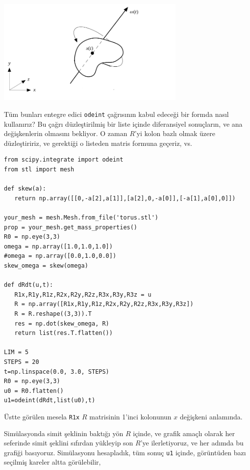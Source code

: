 \documentclass[12pt,fleqn]{article}\usepackage{../../common}
\begin{document}
\includegraphics[width=25em]{compscieng_bpp32sim_rigbod_01.png}

Tüm bunları entegre edici \verb!odeint! çağrısının kabul edeceği bir formda
nasıl kullanırız? Bu çağrı düzleştirilmiş bir liste içinde diferansiyel
sonuçların, ve ana değişkenlerin olmasını bekliyor. O zaman $R$'yi kolon bazlı
olmak üzere düzleştiririz, ve gerektiği o listeden matris formuna geçeriz, vs.

\begin{verbatim}
from scipy.integrate import odeint
from stl import mesh

def skew(a):
   return np.array([[0,-a[2],a[1]],[a[2],0,-a[0]],[-a[1],a[0],0]])

your_mesh = mesh.Mesh.from_file('torus.stl')
prop = your_mesh.get_mass_properties()
R0 = np.eye(3,3)
omega = np.array([1.0,1.0,1.0])
#omega = np.array([0.0,1.0,0.0])
skew_omega = skew(omega)
   
def dRdt(u,t):   
   R1x,R1y,R1z,R2x,R2y,R2z,R3x,R3y,R3z = u
   R = np.array([R1x,R1y,R1z,R2x,R2y,R2z,R3x,R3y,R3z])
   R = R.reshape((3,3)).T
   res = np.dot(skew_omega, R)
   return list(res.T.flatten())

LIM = 5
STEPS = 20
t=np.linspace(0.0, 3.0, STEPS)
R0 = np.eye(3,3)
u0 = R0.flatten()
u1=odeint(dRdt,list(u0),t)
\end{verbatim}

Üstte görülen mesela \verb!R1x! $R$ matrisinin 1'inci kolonunun $x$ değişkeni
anlamında.

Simülasyonda simit şeklinin baktığı yön $R$ içinde, ve grafik amaçlı olarak her
seferinde simit şeklini sıfırdan yükleyip son $R$'ye ilerletiyoruz, ve her
adımda bu grafiği basıyoruz.  Simülasyonu hesapladık, tüm sonuç \verb!u1!
içinde, görüntüden bazı seçilmiş kareler altta görülebilir,
\end{document}
